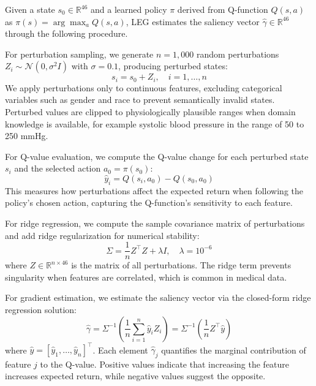 Given a state $s_0 \in \mathbb{R}^{46}$ and a learned policy $\pi$ derived from Q-function $Q(s,a)$ as $\pi(s) = \arg\max_a Q(s,a)$, LEG estimates the saliency vector $\hat{\gamma} \in \mathbb{R}^{46}$ through the following procedure.

For perturbation sampling, we generate $n = 1{,}000$ random perturbations $Z_i \sim \mathcal{N}(0, \sigma^2 I)$ with $\sigma = 0.1$, producing perturbed states:
\begin{equation}
s_i = s_0 + Z_i, \quad i = 1, \ldots, n
\end{equation}
We apply perturbations only to continuous features, excluding categorical variables such as gender and race to prevent semantically invalid states. Perturbed values are clipped to physiologically plausible ranges when domain knowledge is available, for example systolic blood pressure in the range of 50 to 250 mmHg.

For Q-value evaluation, we compute the Q-value change for each perturbed state $s_i$ and the selected action $a_0 = \pi(s_0)$:
\begin{equation}
\hat{y}_i = Q(s_i, a_0) - Q(s_0, a_0)
\end{equation}
This measures how perturbations affect the expected return when following the policy's chosen action, capturing the Q-function's sensitivity to each feature.

For ridge regression, we compute the sample covariance matrix of perturbations and add ridge regularization for numerical stability:
\begin{equation}
\Sigma = \frac{1}{n} Z^\top Z + \lambda I, \quad \lambda = 10^{-6}
\end{equation}
where $Z \in \mathbb{R}^{n \times 46}$ is the matrix of all perturbations. The ridge term prevents singularity when features are correlated, which is common in medical data.

For gradient estimation, we estimate the saliency vector via the closed-form ridge regression solution:
\begin{equation}
\hat{\gamma} = \Sigma^{-1} \left( \frac{1}{n} \sum_{i=1}^n \hat{y}_i Z_i \right) = \Sigma^{-1} \left( \frac{1}{n} Z^\top \hat{y} \right)
\end{equation}
where $\hat{y} = [\hat{y}_1, \ldots, \hat{y}_n]^\top$. Each element $\hat{\gamma}_j$ quantifies the marginal contribution of feature $j$ to the Q-value. Positive values indicate that increasing the feature increases expected return, while negative values suggest the opposite.


